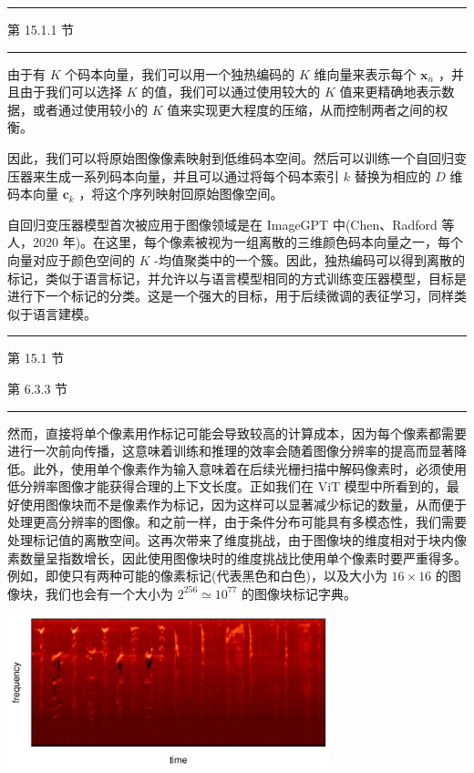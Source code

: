 \documentclass[10pt]{report}
\newcommand{\HRule}{\begin{center}\rule{0.9\linewidth}{0.2mm}\end{center}}
\begin{document}
\HRule

第 15.1.1 节

\HRule

由于有 \(K\) 个码本向量，我们可以用一个独热编码的 \(K\) 维向量来表示每个 \({\mathbf{x}}_{n}\) ，并且由于我们可以选择 \(K\) 的值，我们可以通过使用较大的 \(K\) 值来更精确地表示数据，或者通过使用较小的 \(K\) 值来实现更大程度的压缩，从而控制两者之间的权衡。

因此，我们可以将原始图像像素映射到低维码本空间。然后可以训练一个自回归变压器来生成一系列码本向量，并且可以通过将每个码本索引 \(k\) 替换为相应的 \(D\) 维码本向量 \({\mathbf{c}}_{k}\) ，将这个序列映射回原始图像空间。

自回归变压器模型首次被应用于图像领域是在 ImageGPT 中(Chen、Radford 等人，2020 年)。在这里，每个像素被视为一组离散的三维颜色码本向量之一，每个向量对应于颜色空间的 \(K\) -均值聚类中的一个簇。因此，独热编码可以得到离散的标记，类似于语言标记，并允许以与语言模型相同的方式训练变压器模型，目标是进行下一个标记的分类。这是一个强大的目标，用于后续微调的表征学习，同样类似于语言建模。

\HRule

第 15.1 节

第 6.3.3 节

\HRule

然而，直接将单个像素用作标记可能会导致较高的计算成本，因为每个像素都需要进行一次前向传播，这意味着训练和推理的效率会随着图像分辨率的提高而显著降低。此外，使用单个像素作为输入意味着在后续光栅扫描中解码像素时，必须使用低分辨率图像才能获得合理的上下文长度。正如我们在 ViT 模型中所看到的，最好使用图像块而不是像素作为标记，因为这样可以显著减少标记的数量，从而便于处理更高分辨率的图像。和之前一样，由于条件分布可能具有多模态性，我们需要处理标记值的离散空间。这再次带来了维度挑战，由于图像块的维度相对于块内像素数量呈指数增长，因此使用图像块时的维度挑战比使用单个像素时要严重得多。例如，即使只有两种可能的像素标记(代表黑色和白色)，以及大小为 \({16} \times  {16}\) 的图像块，我们也会有一个大小为 \({2}^{256} \simeq  {10}^{77}\) 的图像块标记字典。

\begin{center}
\includegraphics[max width=0.7\textwidth]{images/0194e279-9b28-703a-88f4-c3ac21e2010d_418_567_349_933_436_0.jpg}
\end{center}
\hspace*{3em} 
\end{document}
